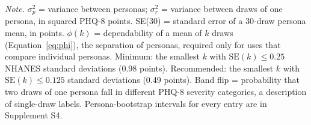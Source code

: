 \begin{table}[tp]
\centering
\caption{Gate: Precision and Separation of a Persona Mean of $k$ Draws, PHQ-8 Total}
\label{tab:gate}
\small
\setlength{\tabcolsep}{4pt}
\vspace{4pt}
\begin{tabnote}
\textit{Note.} $\sigma^2_p$ = variance between personas; $\sigma^2_r$ = variance between draws of one persona, in squared PHQ-8 points. SE(30) = standard error of a 30-draw persona mean, in points. $\phi(k)$ = dependability of a mean of $k$ draws (Equation~\ref{eq:phi}), the separation of personas, required only for uses that compare individual personas. Minimum: the smallest $k$ with $\mathrm{SE}(k) \le 0.25$ NHANES standard deviations (0.98 points). Recommended: the smallest $k$ with $\mathrm{SE}(k) \le 0.125$ standard deviations (0.49 points). Band flip = probability that two draws of one persona fall in different PHQ-8 severity categories, a description of single-draw labels. Persona-bootstrap intervals for every entry are in Supplement S4.
\end{tabnote}
\end{table}
